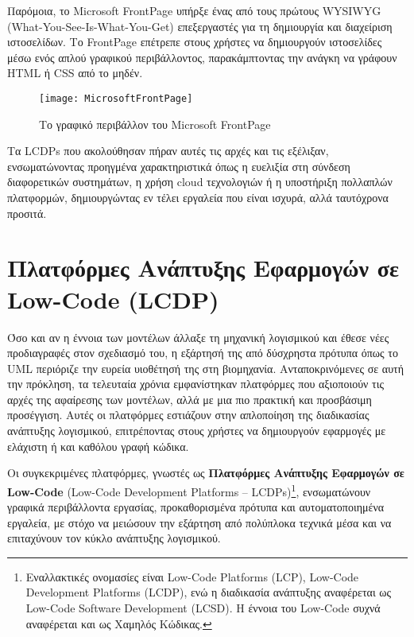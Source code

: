             Παρόμοια, το Microsoft FrontPage υπήρξε ένας από τους πρώτους WYSIWYG (What-You-See-Is-What-You-Get) επεξεργαστές για τη δημιουργία και διαχείριση ιστοσελίδων. Το FrontPage επέτρεπε στους χρήστες να δημιουργούν ιστοσελίδες μέσω ενός απλού γραφικού περιβάλλοντος, παρακάμπτοντας την ανάγκη να γράφουν HTML ή CSS από το μηδέν.

            \begin{figure}[h!] \noindent \centering
                    \texttt{[image: MicrosoftFrontPage]}
                    \caption{\centering Το γραφικό περιβάλλον του Microsoft FrontPage}
            \end{figure}

            Τα LCDPs που ακολούθησαν πήραν αυτές τις αρχές και τις εξέλιξαν, ενσωματώνοντας προηγμένα χαρακτηριστικά όπως η ευελιξία στη σύνδεση διαφορετικών συστημάτων, η χρήση cloud τεχνολογιών ή η υποστήριξη πολλαπλών πλατφορμών, δημιουργώντας εν τέλει εργαλεία που είναι ισχυρά, αλλά ταυτόχρονα προσιτά. \cite{LowCodeSimon}


    \section{Πλατφόρμες Ανάπτυξης Εφαρμογών σε Low-Code (LCDP)} \label{sec:LCDP}
        Όσο και αν η έννοια των μοντέλων άλλαξε τη μηχανική λογισμικού και έθεσε νέες προδιαγραφές στον σχεδιασμό του, η εξάρτησή της από δύσχρηστα πρότυπα όπως το UML περιόριζε την ευρεία υιοθέτησή της στη βιομηχανία. Ανταποκρινόμενες σε αυτή την πρόκληση, τα τελευταία χρόνια εμφανίστηκαν πλατφόρμες που αξιοποιούν τις αρχές της αφαίρεσης των μοντέλων, αλλά με μια πιο πρακτική και προσβάσιμη προσέγγιση. Αυτές οι πλατφόρμες εστιάζουν στην απλοποίηση της διαδικασίας ανάπτυξης λογισμικού, επιτρέποντας στους χρήστες να δημιουργούν εφαρμογές με ελάχιστη ή και καθόλου γραφή κώδικα.

        Οι συγκεκριμένες πλατφόρμες, γνωστές ως \textbf{Πλατφόρμες Ανάπτυξης Εφαρμογών σε Low-Code} (Low-Code Development Platforms -- LCDPs)\footnote{Εναλλακτικές ονομασίες είναι Low-Code Platforms (LCP), Low-Code Development Platforms (LCDP), ενώ η διαδικασία ανάπτυξης αναφέρεται ως Low-Code Software Development (LCSD). Η έννοια του Low-Code συχνά αναφέρεται και ως Χαμηλός Κώδικας.}, ενσωματώνουν γραφικά περιβάλλοντα εργασίας, προκαθορισμένα πρότυπα και αυτοματοποιημένα εργαλεία, με στόχο να μειώσουν την εξάρτηση από πολύπλοκα τεχνικά μέσα και να επιταχύνουν τον κύκλο ανάπτυξης λογισμικού.\cite{Bock2021}

